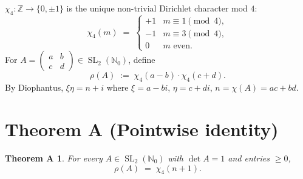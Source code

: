 \documentclass[11pt]{article}
\newtheorem*{theoremA}{Theorem A}
\DeclareMathOperator{\SL}{SL}
\begin{document}
$\chi_4 : \mathbb{Z} \to \{0, \pm 1\}$ is the unique non-trivial Dirichlet
character mod $4$:
\[
\chi_4(m) \;=\;
\begin{cases}
+1 & m \equiv 1 \pmod 4, \\
-1 & m \equiv 3 \pmod 4, \\
0 & m \text{ even}.
\end{cases}
\]
For $A = \begin{pmatrix} a & b \\ c & d \end{pmatrix} \in \SL_2(\mathbb{N}_0)$,
define
\[
\rho(A) \;:=\; \chi_4(a-b) \cdot \chi_4(c+d).
\]
By Diophantus, $\xi\eta = n + i$ where $\xi = a - bi$, $\eta = c + di$,
$n = \chi(A) = ac + bd$.

\section{Theorem A (Pointwise identity)}

\begin{theoremA}
For every $A \in \SL_2(\mathbb{N}_0)$ with $\det A = 1$ and entries $\ge 0$,
\[
\rho(A) \;=\; \chi_4(n+1).
\]
\end{theoremA}
\end{document}
